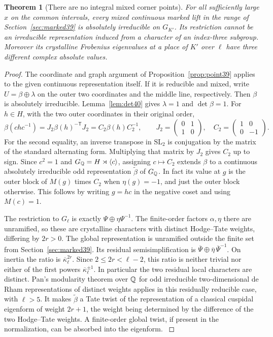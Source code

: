 \documentclass[a4paper,11pt]{article}
\newtheorem{theorem}[proposition]{Theorem}
\theoremstyle{definition}
\theoremstyle{remark}
\numberwithin{equation}{section}
\begin{document}
\begin{theorem}[There are no integral mixed corner points]\label{thm:nocorner40}
For all sufficiently large \(x\) on the common intervals, every mixed continuous marked lift in the range of Section~\ref{sec:marked39} is absolutely irreducible on \(G_{K'}\). Its restriction cannot be an irreducible representation induced from a character of an index-three subgroup. Moreover its crystalline Frobenius eigenvalues at a place of \(K'\) over \(\ell\) have three different complex absolute values.
\end{theorem}
\begin{proof}
The coordinate and graph argument of Proposition~\ref{prop:point39} applies to the given continuous representation itself. If it is reducible and mixed, write \(U=\beta\oplus\lambda\) on the outer two coordinates and the middle line, respectively. Then \(\beta\) is absolutely irreducible. Lemma~\ref{lem:det40} gives \(\lambda=1\) and \(\det\beta=1\). For \(h\in H\), with the two outer coordinates in their original order,
\[
 \beta(chc^{-1})=J_2\beta(h)^{-\mathsf T}J_2
                 =C_2\beta(h)C_2^{-1},\qquad
 J_2=\begin{pmatrix}0&1\\1&0\end{pmatrix},\quad
 C_2=\begin{pmatrix}1&0\\0&-1\end{pmatrix}.
\]
For the second equality, an inverse transpose in \(\mathrm{SL}_2\) is conjugation by the matrix of the standard alternating form. Multiplying that matrix by \(J_2\) gives \(C_2\) up to sign. Since \(c^2=1\) and \(G_\mathbb Q=H\rtimes\langle c\rangle\), assigning \(c\mapsto C_2\) extends \(\beta\) to a continuous absolutely irreducible odd representation \(\widetilde\beta\) of \(G_\mathbb Q\). In fact its value at \(g\) is the outer block of \(M(g)\) times \(C_2\) when \(\eta(g)=-1\), and just the outer block otherwise. This follows by writing \(g=hc\) in the negative coset and using \(M(c)=1\).

The restriction to \(G_\ell\) is exactly \(\Psi\oplus\eta\Psi^{-1}\). The finite-order factors \(\alpha,\eta\) there are unramified, so these are crystalline characters with distinct Hodge--Tate weights, differing by \(2r>0\). The global representation is unramified outside the finite set from Section~\ref{sec:marked39}. Its residual semisimplification is \(\overline\Psi\oplus\overline\eta\,\overline\Psi^{-1}\). On inertia the ratio is \(\overline\kappa_\ell^{2r}\). Since \(2\le 2r<\ell-2\), this ratio is neither trivial nor either of the first powers \(\overline\kappa_\ell^{\pm1}\). In particular the two residual local characters are distinct. Pan's modularity theorem over \(\mathbb Q\) for odd irreducible two-dimensional de Rham representations of distinct weights applies in this residually reducible case, with \(\ell>5\). It makes \(\widetilde\beta\) a Tate twist of the representation of a classical cuspidal eigenform of weight \(2r+1\), the weight being determined by the difference of the two Hodge--Tate weights. A finite-order global twist, if present in the normalization, can be absorbed into the eigenform. \cite{VI-IV-VI-pan40}


\end{proof}
\end{document}
